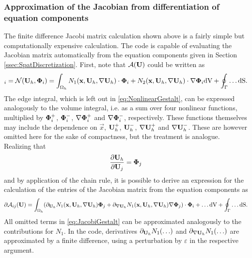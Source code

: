 \subsubsection{Approximation of the Jacobian from differentiation of equation components}
The finite difference Jacobi matrix calculation shown above is a fairly simple but computationally expensive calculation. The \BoSSS code is capable of evaluating the Jacobian matrix automatically from the equation components given in Section \ref{ssec:SpatDiscretization}.
First, note that $\mathcal{A}(\textbf{U})$ could be written as
\begin{equation}
	[\mathcal{A}(\myvector{U})]_i = \mathcal{N}( \myvector{U}_h , \gvec{\Phi}_i) =
	\int_{\Omega_h}
	N_1 (\vec{x}, \myvector{U}_h , \nabla \myvector{U}_h  ) \cdot \gvec{\Phi}_i
	+ N_2 (\vec{x}, \myvector{U}_h , \nabla \myvector{U}_h  ) \cdot \nabla \gvec{\Phi}_i
	\textrm{dV}
	+
	\oint_{\Gamma} \ldots \mathrm{dS}.
	\label{eq:NonlinearGestalt}
\end{equation}
The edge integral, which is left out in \cref{eq:NonlinearGestalt},
can be expressed analogously to the volume integral, i.e. as a sum over
four nonlinear functions, multiplied by
$ \boldsymbol{\Phi}_i^{+}$,  $\boldsymbol{\Phi}_i^{-}$, $ \nabla \boldsymbol{\Phi}_i^{+}$ and  $ \nabla \boldsymbol{\Phi}_i^{-}$,
respectively.
These functions themselves may include the dependence on
$\vec{x}$, $\textbf{U}_h^{+}$,  $\textbf{U}_h^{-}$, $\nabla \textbf{U}_h^{+}$ and  $\nabla \textbf{U}_h^{-}$.
These are however omitted here for the sake of compactness, but the treatment is analogue. Realizing that 
\begin{equation}
	\frac{\partial \textbf{U}_h}{\partial \textbf{U}_j}  = \boldsymbol{\Phi}_j
\end{equation}
and by application of the chain rule, it is possible to derive an expression for the calculation of the entries of the Jacobian matrix from the equation components as
\begin{equation}
	\partial \mathcal{A}_{ij}(\textbf{U}) =
	\int_{\Omega_h}
	( \partial_{ \textbf{U}_h}       N_1 (\textbf{x}, \textbf{U}_h , \nabla \textbf{U}_h  ) \boldsymbol{\Phi}_j
	+   \partial_{\nabla \textbf{U}_h} N_1 (\textbf{x}, \textbf{U}_h , \nabla \textbf{U}_h  ) \nabla \boldsymbol{\Phi}_j ) \cdot \boldsymbol{\Phi}_i
	+ \ldots
	\textrm{dV}
	+
	\oint_{\Gamma} \ldots \mathrm{dS} .
	\label{eq:JacobiGestalt}
\end{equation}
All omitted  terms in \cref{eq:JacobiGestalt} can be approximated analogously to the contributions for $N_1$. In the \BoSSS code, derivatives $ \partial_{ \textbf{U}_h} N_1 ( \ldots )$ and  $ \partial_{ \nabla \textbf{U}_h} N_1 ( \ldots )$ are approximated by a finite difference, using a perturbation by $\varepsilon$ in the respective argument.

